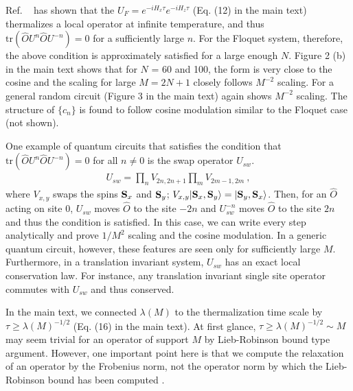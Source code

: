 \documentclass[twocolumn,superscriptaddress, prl,showpacs]{revtex4-1}
\begin{document}
Ref. ~ has shown that the $U_F = e^{-i H_x \tau} e^{-i H_z \tau}$ (Eq. (12) in the main text) thermalizes a local operator at infinite temperature,
and thus $\mathrm{tr}(\hat{O}U^n\hat{O}U^{-n}) = 0$ for a sufficiently large $n$.
For the Floquet system, therefore, the above condition is approximately satisfied for a large enough $N$.
Figure 2 (b) in the main text shows that for $N$ = 60 and 100, the form is very close to the cosine
and the scaling for large $M = 2N +1$ closely follows $M^{-2}$ scaling.
For a general random circuit (Figure 3 in the main text) again shows $M^{-2}$ scaling. The structure of $\{c_n\}$
is found to follow cosine modulation similar to the Floquet case (not shown).

One example of quantum circuits that satisfies the condition that $\mathrm{tr}(\hat{O}U^{n} \hat{O}U^{-n}) = 0$ for all $n\neq0$
is the swap operator $U_{sw}$.
\begin{align}
U_{sw} = \prod_n V_{2n,2n+1} \prod_m V_{2m-1,2m} ~,
\end{align}
where $V_{x,y}$ swaps the spins ${\bf S}_x$ and ${\bf S}_y$; $V_{x,y}|{\bf S}_x,{\bf S}_y\rangle = |{\bf S}_y, {\bf S}_x\rangle$.
Then, for an $\hat{O}$ acting on site 0, $U_{sw}$ moves $\hat{O}$ to the site $-2n$ and $U_{sw}^{-n}$ moves $\hat{O}$ to the site $2n$
and thus the condition is satisfied.
In this case, we can write every step analytically and prove $1/M^2$ scaling and the cosine modulation.
In a generic quantum circuit, however, these features are seen only for sufficiently large $M$.
Furthermore, in a translation invariant system, $U_{sw}$ has an exact local conservation law.
For instance, any translation invariant single site operator commutes with $U_{sw}$ and thus conserved.

In the main text, we connected $\lambda(M)$ to the thermalization time scale by $\tau \geq \lambda(M)^{-1/2}$ (Eq. (16) in the main text).
At first glance, $\tau \geq \lambda(M)^{-1/2} \sim M$ may seem trivial for an operator of support $M$ by Lieb-Robinson bound type argument.
However, one important point here is that we compute the relaxation of an operator by the Frobenius norm,
not the operator norm by which the Lieb-Robinson bound has been computed \cite{Lieb:1972}.


\end{document}
